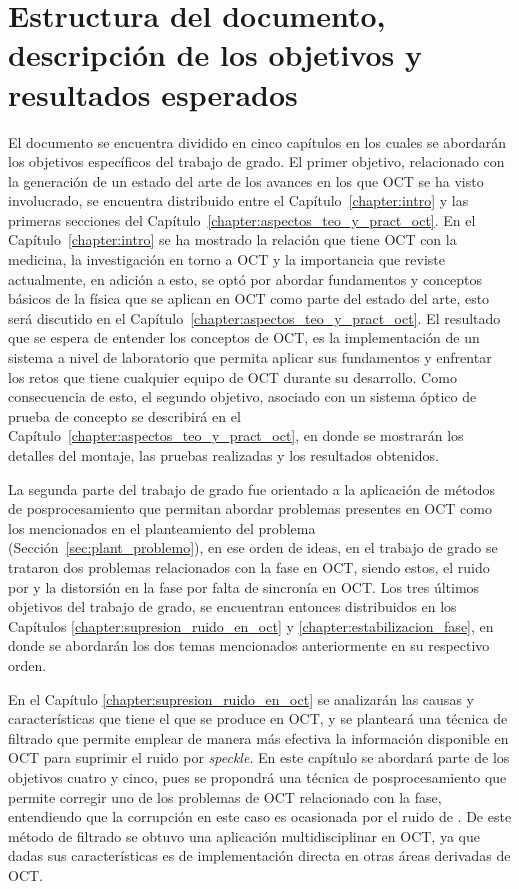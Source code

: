\section{Estructura del documento, descripción de los objetivos y resultados esperados}

El documento se encuentra dividido en cinco capítulos en los cuales se abordarán los objetivos específicos del trabajo de grado. El primer objetivo, relacionado con la generación de un estado del arte de los avances en los que OCT se ha visto involucrado, se encuentra distribuido entre el Capítulo~\ref{chapter:intro} y las primeras secciones del Capítulo~\ref{chapter:aspectos_teo_y_pract_oct}. En el Capítulo~\ref{chapter:intro} se ha mostrado la relación que tiene OCT con la medicina, la investigación en torno a OCT y la importancia que reviste actualmente, en adición a esto, se optó por abordar fundamentos y conceptos básicos de la física que se aplican en OCT como parte del estado del arte, esto será discutido en el Capítulo~\ref{chapter:aspectos_teo_y_pract_oct}. El resultado que se espera de entender los conceptos de OCT, es la implementación de un sistema a nivel de laboratorio que permita aplicar sus fundamentos y enfrentar los retos que tiene cualquier equipo de OCT durante su desarrollo. Como consecuencia de esto, el segundo objetivo, asociado con un sistema óptico de prueba de concepto se describirá en el Capítulo~\ref{chapter:aspectos_teo_y_pract_oct}, en donde se mostrarán los detalles del montaje, las pruebas realizadas y los resultados obtenidos.

La segunda parte del trabajo de grado fue orientado a la aplicación de métodos de posprocesamiento que permitan abordar problemas presentes en OCT como los mencionados en el planteamiento del problema (Sección~\ref{sec:plant_problemo}), en ese orden de ideas, en el trabajo de grado se trataron dos problemas relacionados con la fase en OCT, siendo estos, el ruido por \speckle y la distorsión en la fase por falta de sincronía en OCT. Los tres últimos objetivos del trabajo de grado, se encuentran entonces distribuidos en los Capítulos \ref{chapter:supresion_ruido_en_oct} y \ref{chapter:estabilizacion_fase}, en donde se abordarán los dos temas mencionados anteriormente en su respectivo orden.

En el Capítulo \ref{chapter:supresion_ruido_en_oct} se analizarán las causas y características que tiene el \speckle  que se produce en OCT, y se planteará una técnica de filtrado que permite emplear de manera más efectiva la información disponible en OCT para suprimir el ruido por \textit{speckle}. En este capítulo se abordará parte de los objetivos cuatro y cinco, pues se propondrá una técnica de posprocesamiento que permite corregir uno de los problemas de OCT relacionado con la fase, entendiendo que la corrupción en este caso es ocasionada por el ruido de . De este método de filtrado se obtuvo una aplicación multidisciplinar en OCT, ya que dadas sus características es de implementación directa en otras áreas derivadas de OCT.

